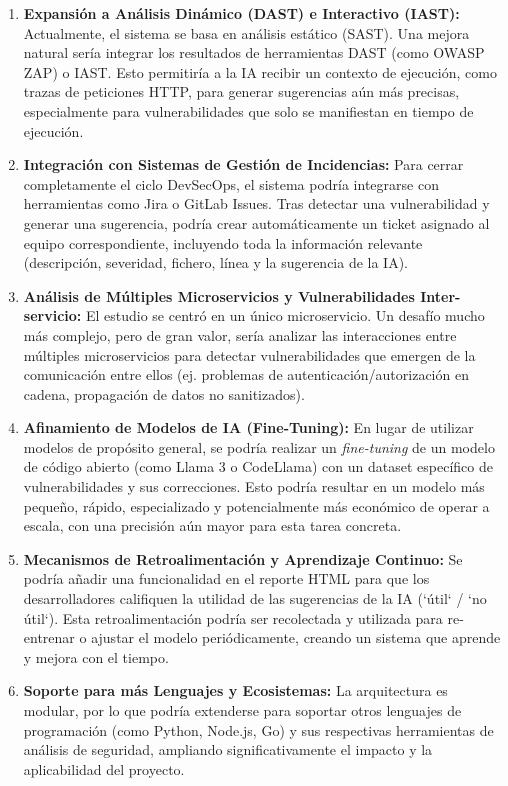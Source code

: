 \begin{enumerate}
    \item \textbf{Expansión a Análisis Dinámico (DAST) e Interactivo (IAST):} Actualmente, el sistema se basa en análisis estático (SAST). Una mejora natural sería integrar los resultados de herramientas DAST (como OWASP ZAP) o IAST. Esto permitiría a la IA recibir un contexto de ejecución, como trazas de peticiones HTTP, para generar sugerencias aún más precisas, especialmente para vulnerabilidades que solo se manifiestan en tiempo de ejecución.

    \item \textbf{Integración con Sistemas de Gestión de Incidencias:} Para cerrar completamente el ciclo DevSecOps, el sistema podría integrarse con herramientas como Jira o GitLab Issues. Tras detectar una vulnerabilidad y generar una sugerencia, podría crear automáticamente un ticket asignado al equipo correspondiente, incluyendo toda la información relevante (descripción, severidad, fichero, línea y la sugerencia de la IA).

    \item \textbf{Análisis de Múltiples Microservicios y Vulnerabilidades Inter-servicio:} El estudio se centró en un único microservicio. Un desafío mucho más complejo, pero de gran valor, sería analizar las interacciones entre múltiples microservicios para detectar vulnerabilidades que emergen de la comunicación entre ellos (ej. problemas de autenticación/autorización en cadena, propagación de datos no sanitizados).

    \item \textbf{Afinamiento de Modelos de IA (Fine-Tuning):} En lugar de utilizar modelos de propósito general, se podría realizar un \textit{fine-tuning} de un modelo de código abierto (como Llama 3 o CodeLlama) con un dataset específico de vulnerabilidades y sus correcciones. Esto podría resultar en un modelo más pequeño, rápido, especializado y potencialmente más económico de operar a escala, con una precisión aún mayor para esta tarea concreta.

    \item \textbf{Mecanismos de Retroalimentación y Aprendizaje Continuo:} Se podría añadir una funcionalidad en el reporte HTML para que los desarrolladores califiquen la utilidad de las sugerencias de la IA (`útil` / `no útil`). Esta retroalimentación podría ser recolectada y utilizada para re-entrenar o ajustar el modelo periódicamente, creando un sistema que aprende y mejora con el tiempo.

    \item \textbf{Soporte para más Lenguajes y Ecosistemas:} La arquitectura es modular, por lo que podría extenderse para soportar otros lenguajes de programación (como Python, Node.js, Go) y sus respectivas herramientas de análisis de seguridad, ampliando significativamente el impacto y la aplicabilidad del proyecto.
\end{enumerate}

